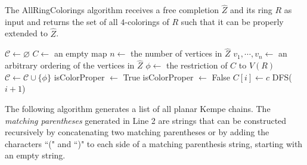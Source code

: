 \documentclass[main.tex]{subfiles}
\begin{document}
The AllRingColorings algorithm receives a free completion $\hat{Z}$ and its ring $R$ as input and returns the set of all $4$-colorings of $R$ such that it can be properly extended to $\hat{Z}$.

\begin{algorithm}[H]
    \caption{AllRingColorings($\hat{Z}$, $R$)}
    \label{alg:check-red_ring-coloring}
    \begin{algorithmic}[1]
        \State $\mathcal{C} \gets \varnothing$
        \State $C \gets$ an empty map
        \State $n \gets$ the number of vertices in $\hat{Z}$
        \State $v_1, \cdots, v_n \gets$ an arbitrary ordering of the vertices in $\hat{Z}$
                \State $\phi \gets$ the restriction of $C$ to $V(R)$ 
                \State $\mathcal{C} \gets \mathcal{C} \cup \{\phi\}$
            \EndIf
                \State isColorProper $\gets$ True
                        \State isColorProper $\gets$ False
                        \Break
                    \EndIf
                \EndFor
                    \State $C[i] \gets c$
                    \State DFS($i + 1$)
                \EndIf
            \EndFor
        \EndProcedure
        \State {}
    \end{algorithmic}
\end{algorithm}

The following algorithm generates a list of all planar Kempe chains.
The \emph{matching parentheses} generated in Line 2 are strings that can be constructed recursively by concatenating two matching parentheses or by adding the characters ``(" and ``)" to each side of a matching parenthesis string, starting with an empty string.
\end{document}
